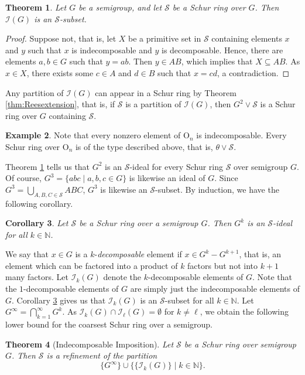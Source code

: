 \documentclass{article}
\theoremstyle{plain}
\newtheorem{Thm}{Theorem}[section]
\newtheorem{Cor}[Thm]{Corollary}
\theoremstyle{definition}
\newtheorem{Exam}[Thm]{Example}
\newcommand{\thmref}[1]{Theorem \ref{#1}}
\newcommand{\corref}[1]{Corollary \ref{#1}}
\renewcommand{\S}{\mathcal{S}}
\newcommand{\N}{\mathbb{N}}
\newcommand{\I}{\mathscr{I}}
\renewcommand{\O}{\mathrm{O}}
\begin{document}
\begin{Thm}\label{thm:indecomp} Let $G$ be a semigroup, and let $\S$ be a Schur ring over $G$. Then $\I(G)$ is an $\S$-subset.
\end{Thm}
\begin{proof}
    Suppose not, that is, let $X$ be a primitive set in $\S$ containing elements $x$ and $y$ such that $x$ is indecomposable and $y$ is decomposable. Hence, there are elements $a,b\in G$ such that $y=ab$. Then $y\in AB$, which implies that $X\subseteq AB$. As $x\in X$, there exists some $c\in A$ and $d\in B$ such that $x=cd$, a contradiction.  
\end{proof}

Any partition of $\I(G)$ can appear in a Schur ring by \thmref{thm:Reesextension}, that is, if $\S$ is a partition of $\I(G)$, then $G^2\vee \S$ is a Schur ring over $G$ containing $\S$.

\begin{Exam}\label{exam:nullindecomp} Note that every nonzero element of $\O_n$ is indecomposable. Every Schur ring over $\O_n$ is of the type described above, that is, $\theta \vee \S$. 
\end{Exam}

\thmref{thm:indecomp} tells us that $G^2$ is an $\S$-ideal for every Schur ring $\S$ over semigroup $G$. Of course, $G^3 =\{abc\mid a,b,c\in G\}$ is likewise an ideal of $G$. 
Since $G^3=\bigcup_{A,B,C\in \S} ABC$, $G^3$ is likewise an $\S$-subset. By induction, we have the following corollary.

\begin{Cor}\label{cor:indecomp} Let $\S$ be a Schur ring over a semigroup $G$. Then $G^k$ is an $\S$-ideal for all $k\in \N$.
\end{Cor}

We say that $x\in G$ is a $k$-\emph{decomposable} element if \label{kdecomp}$x\in G^{k}- G^{k+1}$, that is, an element which can be factored into a product of $k$ factors but not into $k+1$ many factors. Let $\I_k(G)$ denote the $k$-decomposable elements of $G$. Note that the $1$-decomposable elements of $G$ are simply just the indecomposable elements of $G$. \corref{cor:indecomp} gives us that $\I_k(G)$ is an $\S$-subset for all $k\in \N$. Let \label{ginfty}$G^\infty = \bigcap_{k=1}^\infty G^k$. As $\I_k(G)\cap \I_\ell(G)=\emptyset$ for $k\neq \ell$, we obtain the following lower bound for the coarsest Schur ring over a semigroup.

\begin{Thm}[Indecomposable Imposition]\label{Thm:indecompseries} Let $\S$ be a Schur ring over semigroup $G$. Then $\S$ is a refinement of the partition
\[\{G^\infty\} \cup \{\{\I_k(G)\}\mid k\in \N\}.\]
\end{Thm}
\end{document}
